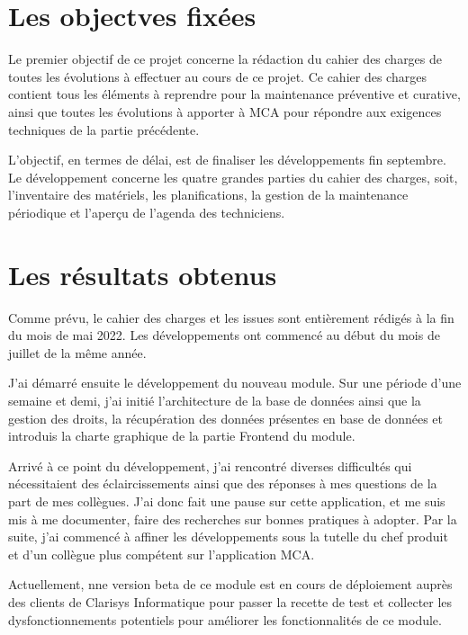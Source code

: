 \section{Les objectves fixées}
Le premier objectif de ce projet concerne la rédaction du cahier des charges de toutes les 
évolutions à effectuer au cours de ce projet. Ce cahier des charges contient tous les éléments 
à reprendre pour la maintenance préventive et curative, ainsi que toutes les évolutions à apporter 
à MCA pour répondre aux exigences techniques de la partie précédente.

L’objectif, en termes de délai, est de finaliser les développements fin septembre. 
Le développement concerne les quatre grandes parties du cahier des charges, soit, 
l’inventaire des matériels, les planifications, la gestion de la maintenance périodique et 
l’aperçu de l’agenda des techniciens.
\section{Les résultats obtenus}
Comme prévu, le cahier des charges et les issues sont entièrement rédigés à la fin du mois de mai 2022. 
Les développements ont commencé au début du mois de juillet de la même année.

J’ai démarré ensuite le développement du nouveau module. Sur une période d’une semaine et demi, 
j’ai initié l’architecture de la base de données ainsi que la gestion des droits, 
la récupération des données présentes en base de données et introduis la charte graphique de 
la partie Frontend du module.

Arrivé à ce point du développement, j’ai rencontré diverses difficultés qui nécessitaient des 
éclaircissements ainsi que des réponses à mes questions de la part de mes collègues. 
J’ai donc fait une pause sur cette application, et me suis mis à me documenter, faire des recherches sur bonnes pratiques à adopter.
Par la suite, j’ai commencé à affiner les développements sous la tutelle du chef produit et 
d’un collègue plus compétent sur l’application MCA.

Actuellement, nne version beta de ce module est en cours de déploiement auprès des clients de Clarisys 
Informatique pour passer la recette de test et collecter les dysfonctionnements potentiels pour améliorer les fonctionnalités de ce module.